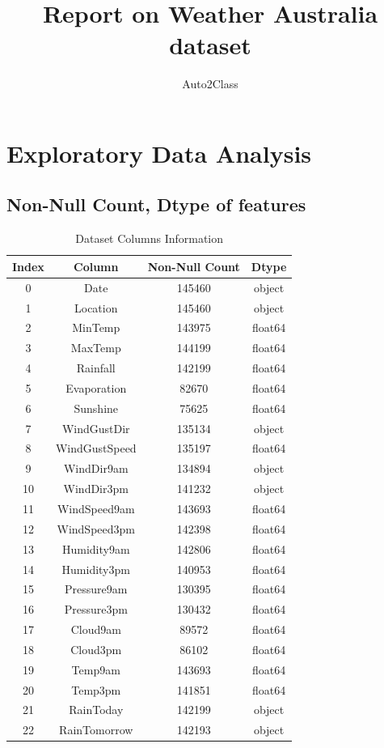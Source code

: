 \documentclass{article}%
\title{Report on Weather Australia dataset}%
\author{Auto2Class}%
\begin{document}
%
\normalsize%
\maketitle%
\newpage%
\tableofcontents%
\newpage%
\section{Exploratory Data Analysis}%
\label{sec:ExploratoryDataAnalysis}%
\subsection{Non{-}Null Count, Dtype of features}%
\label{subsec:Non{-}NullCount,Dtypeoffeatures}%


\begin{table}[h!]%
\caption{Dataset Columns Information}%
\vspace{0.2cm}%
\centering%
\begin{tabular}{|c||c||c||c|}%
\hline%
Index&Column&Non{-}Null Count&Dtype\\%
\hline%
0&Date&145460&object\\%
1&Location&145460&object\\%
2&MinTemp&143975&float64\\%
3&MaxTemp&144199&float64\\%
4&Rainfall&142199&float64\\%
5&Evaporation&82670&float64\\%
6&Sunshine&75625&float64\\%
7&WindGustDir&135134&object\\%
8&WindGustSpeed&135197&float64\\%
9&WindDir9am&134894&object\\%
10&WindDir3pm&141232&object\\%
11&WindSpeed9am&143693&float64\\%
12&WindSpeed3pm&142398&float64\\%
13&Humidity9am&142806&float64\\%
14&Humidity3pm&140953&float64\\%
15&Pressure9am&130395&float64\\%
16&Pressure3pm&130432&float64\\%
17&Cloud9am&89572&float64\\%
18&Cloud3pm&86102&float64\\%
19&Temp9am&143693&float64\\%
20&Temp3pm&141851&float64\\%
21&RainToday&142199&object\\%
22&RainTomorrow&142193&object\\%
\hline%
\end{tabular}%
\end{table}
\end{document}
